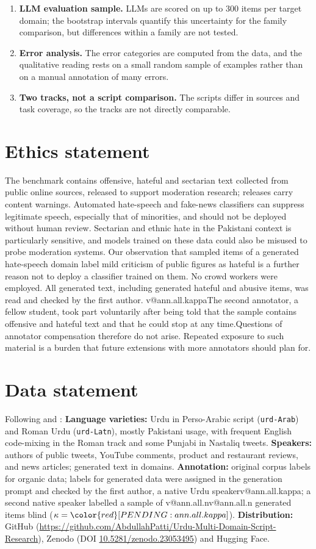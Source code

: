 \documentclass[acmsmall,screen]{acmart}
\makeatletter
\newcommand{\pending}[1]{{\color{red}[PENDING: #1]}}
\newcommand{\val}[1]{\ifcsname v@#1\endcsname\csname v@#1\endcsname\else\pending{#1}\fi}
\newcommand{\ifannotated}[2]{\ifcsname v@ann.all.kappa\endcsname#1\else#2\fi}
\newcommand{\repo}{\url{https://github.com/AbdullahPatti/Urdu-Multi-Domain-Script-Research}}
\makeatother
\begin{document}
\begin{enumerate}[leftmargin=*,itemsep=2pt]
\item \textbf{LLM evaluation sample.} LLMs are scored on up to 300 items per target domain; the bootstrap intervals quantify this uncertainty for the family comparison, but differences within a family are not tested.
\item \textbf{Error analysis.} The error categories are computed from the data, and the qualitative reading rests on a small random sample of examples rather than on a manual annotation of many errors.
\item \textbf{Two tracks, not a script comparison.} The scripts differ in sources and task coverage, so the tracks are not directly comparable.
\end{enumerate}

\section{Ethics statement}
The benchmark contains offensive, hateful and sectarian text collected from public online sources, released to support moderation research; releases carry content warnings. Automated hate-speech and fake-news classifiers can suppress legitimate speech, especially that of minorities, and should not be deployed without human review. Sectarian and ethnic hate in the Pakistani context is particularly sensitive, and models trained on these data could also be misused to probe moderation systems. Our observation that sampled items of a generated hate-speech domain label mild criticism of public figures as hateful is a further reason not to deploy a classifier trained on them. No crowd workers were employed. All generated text, including generated hateful and abusive items, was read and checked by the first author. \ifannotated{The second annotator, a fellow student, took part voluntarily after being told that the sample contains offensive and hateful text and that he could stop at any time.}{Questions of annotator compensation therefore do not arise.} Repeated exposure to such material is a burden that future extensions with more annotators should plan for.

\section{Data statement}
Following \citet{bender2018data} and \citet{gebru2021datasheets}: \textbf{Language varieties:} Urdu in Perso-Arabic script (\texttt{urd-Arab}) and Roman Urdu (\texttt{urd-Latn}), mostly Pakistani usage, with frequent English code-mixing in the Roman track and some Punjabi in Nastaliq tweets. \textbf{Speakers:} authors of public tweets, YouTube comments, product and restaurant reviews, and news articles; generated text in \NumSynthDomains{} domains. \textbf{Annotation:} original corpus labels for organic data; labels for generated data were assigned in the generation prompt and checked by the first author, a native Urdu speaker\ifannotated{; a second native speaker labelled a sample of \val{ann.all.n} generated items blind ($\kappa=\val{ann.all.kappa}$)}{}. \textbf{Distribution:} GitHub (\repo), Zenodo (DOI \href{https://doi.org/10.5281/zenodo.23053495}{10.5281/zenodo.23053495}) and Hugging Face.
\end{document}
